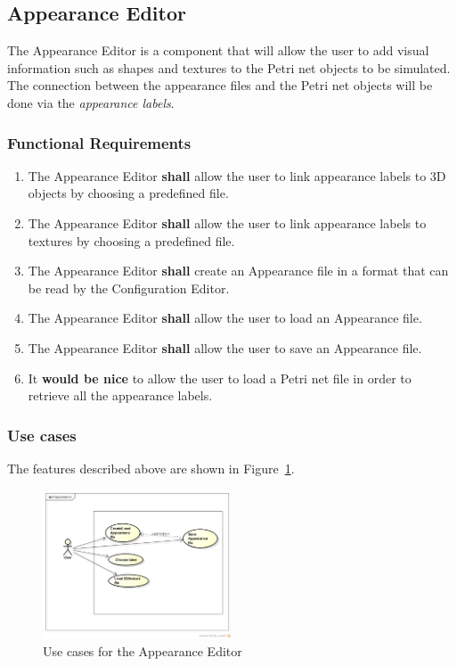 \subsection{Appearance Editor}
\label{sec:sf-appearance}

The Appearance Editor is a component that will allow the user to add visual information such as shapes and textures to the Petri net objects to be simulated. The connection between the appearance files and the Petri net objects will be done via the \textit{appearance labels}. 

\subsubsection{Functional Requirements}

\begin{enumerate}
\item The Appearance Editor \textbf{shall} allow the user to link appearance labels to 3D objects by choosing a predefined file.
\item The Appearance Editor \textbf{shall} allow the user to link appearance labels to textures by choosing a predefined file.
\item The Appearance Editor \textbf{shall} create an Appearance file in a format that can be read by the Configuration Editor.
\item The Appearance Editor \textbf{shall} allow the user to load an Appearance file.
\item The Appearance Editor \textbf{shall} allow the user to save an Appearance file.
\item It \textbf{would be nice} to allow the user to load a Petri net file in order to retrieve all the appearance labels.     
\end{enumerate}

\subsubsection{Use cases}

The features described above are shown in Figure~\ref{fig:use-cases-appearance-editor}.

\begin{figure}[htp]
\begin{center}
  \includegraphics[width=0.5\textwidth]{image/uc-appearance.png}
  \caption{Use cases for the Appearance Editor}
  \label{fig:use-cases-appearance-editor}
\end{center}
\end{figure}


